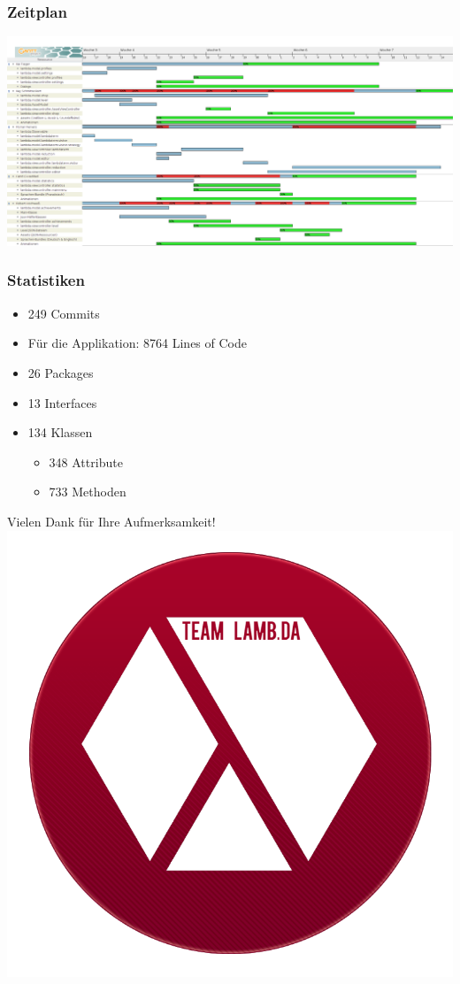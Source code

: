\documentclass[18pt]{beamer}
\begin{document}
\begin{frame}
	\frametitle{Zeitplan}
	\includegraphics[width=\textwidth]{pictures/Implementierungsplan_ende}
\end{frame}

\begin{frame}
	\frametitle{Statistiken}
	\begin{itemize}[<+->]
		\item 249 Commits
		\item Für die Applikation: 8764 Lines of Code
		\item 26 Packages
		\item 13 Interfaces
		\item 134 Klassen
		\begin{itemize}
			\item 348 Attribute
			\item 733 Methoden
		\end{itemize}
	\end{itemize}
\end{frame}

\begin{frame}
	\centering
	\huge Vielen Dank für Ihre Aufmerksamkeit!
	\includegraphics[scale=0.8]{team_lambda_lg.png}
\end{frame}
\end{document}
